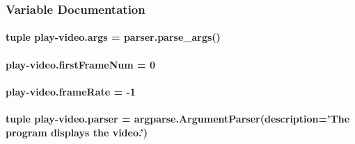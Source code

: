 \subsubsection{Variable Documentation}
\hypertarget{namespaceplay-video_a3d22c1d9d5993f4571eda1a381b008ce}{
\paragraph[{args}]{\setlength{\rightskip}{0pt plus 5cm}tuple play-\/video.\-args = parser.\-parse\-\_\-args()}}\label{namespaceplay-video_a3d22c1d9d5993f4571eda1a381b008ce}
\hypertarget{namespaceplay-video_a02736d75444e0d9051079c55cd648d58}{
\paragraph[{first\-Frame\-Num}]{\setlength{\rightskip}{0pt plus 5cm}play-\/video.\-first\-Frame\-Num = 0}}\label{namespaceplay-video_a02736d75444e0d9051079c55cd648d58}
\hypertarget{namespaceplay-video_ae12c2e1c8988e73e97b2d64060e8a853}{
\paragraph[{frame\-Rate}]{\setlength{\rightskip}{0pt plus 5cm}play-\/video.\-frame\-Rate = -\/1}}\label{namespaceplay-video_ae12c2e1c8988e73e97b2d64060e8a853}
\hypertarget{namespaceplay-video_a96130bca428a51e38a074bd472f58345}{
\paragraph[{parser}]{\setlength{\rightskip}{0pt plus 5cm}tuple play-\/video.\-parser = argparse.\-Argument\-Parser(description='The program displays the video.')}}\label{namespaceplay-video_a96130bca428a51e38a074bd472f58345}
